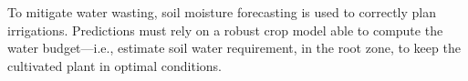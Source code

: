 


To mitigate water wasting, soil moisture forecasting is used to correctly plan irrigations.
Predictions must rely on a robust crop model able to compute the water budget---i.e., estimate soil water requirement, in the root zone, to keep the cultivated plant in optimal conditions.


